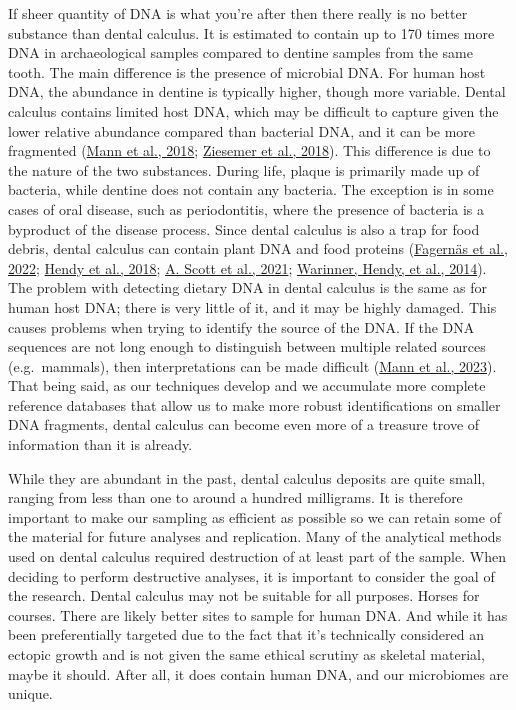 \documentclass[
  letterpaper,
]{book}
\begin{document}
If sheer quantity of DNA is what you're after then there really is no
better substance than dental calculus. It is estimated to contain up to
170 times more DNA in archaeological samples compared to dentine samples
from the same tooth. The main difference is the presence of microbial
DNA. For human host DNA, the abundance in dentine is typically higher,
though more variable. Dental calculus contains limited host DNA, which
may be difficult to capture given the lower relative abundance compared
than bacterial DNA, and it can be more fragmented
(\protect\hyperlink{ref-mannDifferentialPreservation2018}{Mann et al.,
2018}; \protect\hyperlink{ref-ziesemerGenomeCalculus2018}{Ziesemer et
al., 2018}). This difference is due to the nature of the two substances.
During life, plaque is primarily made up of bacteria, while dentine does
not contain any bacteria. The exception is in some cases of oral
disease, such as periodontitis, where the presence of bacteria is a
byproduct of the disease process. Since dental calculus is also a trap
for food debris, dental calculus can contain plant DNA and food proteins
(\protect\hyperlink{ref-fagernasMicrobialBiogeography2022}{Fagernäs et
al., 2022}; \protect\hyperlink{ref-hendyProteomicCalculus2018}{Hendy et
al., 2018}; \protect\hyperlink{ref-scottExoticFoods2021}{A. Scott et
al., 2021}; \protect\hyperlink{ref-warinnerEvidenceMilk2014}{Warinner,
Hendy, et al., 2014}). The problem with detecting dietary DNA in dental
calculus is the same as for human host DNA; there is very little of it,
and it may be highly damaged. This causes problems when trying to
identify the source of the DNA. If the DNA sequences are not long enough
to distinguish between multiple related sources (e.g.~mammals), then
interpretations can be made difficult
(\protect\hyperlink{ref-mannHaveSomething2023}{Mann et al., 2023}). That
being said, as our techniques develop and we accumulate more complete
reference databases that allow us to make more robust identifications on
smaller DNA fragments, dental calculus can become even more of a
treasure trove of information than it is already.

While they are abundant in the past, dental calculus deposits are quite
small, ranging from less than one to around a hundred milligrams. It is
therefore important to make our sampling as efficient as possible so we
can retain some of the material for future analyses and replication.
Many of the analytical methods used on dental calculus required
destruction of at least part of the sample. When deciding to perform
destructive analyses, it is important to consider the goal of the
research. Dental calculus may not be suitable for all purposes. Horses
for courses. There are likely better sites to sample for human DNA. And
while it has been preferentially targeted due to the fact that it's
technically considered an ectopic growth and is not given the same
ethical scrutiny as skeletal material, maybe it should. After all, it
does contain human DNA, and our microbiomes are unique.
\end{document}
